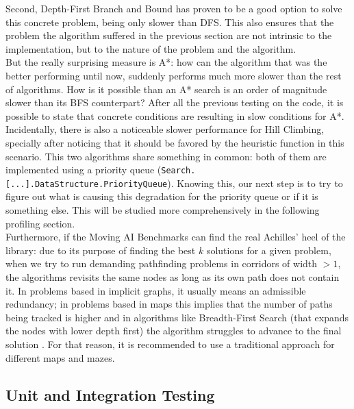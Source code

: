 Second, Depth-First Branch and Bound has proven to be a good option to solve
this concrete problem, being only slower than DFS. This also ensures that the
problem the algorithm suffered in the previous section are not intrinsic to the
implementation, but to the nature of the problem and the algorithm.\\

But the really surprising measure is A*: how can the algorithm that was the
better performing until now, suddenly performs much more slower than the rest
of algorithms. How is it possible than an A* search is an order of magnitude
slower than its BFS counterpart? After all the previous testing on the code, it
is possible to state that concrete conditions are resulting in slow conditions
for A*. Incidentally, there is also a noticeable slower performance for Hill
Climbing, specially after noticing that it should be favored by the heuristic
function in this scenario. This two algorithms share something in common: both
of them are implemented using a priority queue
(\texttt{Search.[...].DataStructure.PriorityQueue}). Knowing this, our next
step is to try to figure out what is causing this degradation for the priority
queue or if it is something else. This will be studied more comprehensively in
the following profiling section.\\

Furthermore, if the Moving AI Benchmarks can find the real Achilles' heel of
the library: due to its purpose of finding the best $k$ solutions for a given
problem, when we try to run demanding pathfinding problems in corridors of
width $>1$, the algorithms revisits the same nodes as long as its own path does
not contain it. In problems based in implicit graphs, it usually means an
admissible redundancy; in problems based in maps this implies that the number
of paths being tracked is higher and in algorithms like Breadth-First Search
(that expands the nodes with lower depth first) the algorithm struggles to
advance to the final solution \cite{dechter-2012-search}. For that reason, it
is recommended to use a traditional approach for different maps and mazes.\\

\subsection{Unit and Integration Testing}

